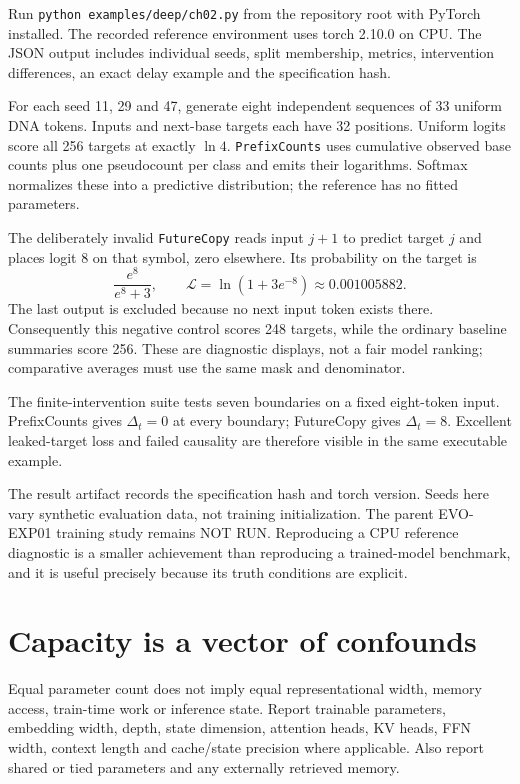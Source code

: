 Run \texttt{python examples/deep/ch02.py} from the repository root with PyTorch installed. The recorded reference environment uses torch 2.10.0 on CPU. The JSON output includes individual seeds, split membership, metrics, intervention differences, an exact delay example and the specification hash.

For each seed 11, 29 and 47, generate eight independent sequences of 33 uniform DNA tokens. Inputs and next-base targets each have 32 positions. Uniform logits score all 256 targets at exactly $\ln4$. \texttt{PrefixCounts} uses cumulative observed base counts plus one pseudocount per class and emits their logarithms. Softmax normalizes these into a predictive distribution; the reference has no fitted parameters.

The deliberately invalid \texttt{FutureCopy} reads input $j+1$ to predict target $j$ and places logit 8 on that symbol, zero elsewhere. Its probability on the target is
\[
\frac{e^8}{e^8+3},\qquad
\mathcal L=\ln(1+3e^{-8})\approx0.001005882.
\]
The last output is excluded because no next input token exists there. Consequently this negative control scores 248 targets, while the ordinary baseline summaries score 256. These are diagnostic displays, not a fair model ranking; comparative averages must use the same mask and denominator.

\begin{center}

\end{center}

The finite-intervention suite tests seven boundaries on a fixed eight-token input. PrefixCounts gives $\Delta_t=0$ at every boundary; FutureCopy gives $\Delta_t=8$. Excellent leaked-target loss and failed causality are therefore visible in the same executable example.

The result artifact records the specification hash and torch version. Seeds here vary synthetic evaluation data, not training initialization. The parent EVO-EXP01 training study remains NOT RUN. Reproducing a CPU reference diagnostic is a smaller achievement than reproducing a trained-model benchmark, and it is useful precisely because its truth conditions are explicit.

\section{Capacity is a vector of confounds}
Equal parameter count does not imply equal representational width, memory access, train-time work or inference state. Report trainable parameters, embedding width, depth, state dimension, attention heads, KV heads, FFN width, context length and cache/state precision where applicable. Also report shared or tied parameters and any externally retrieved memory.

